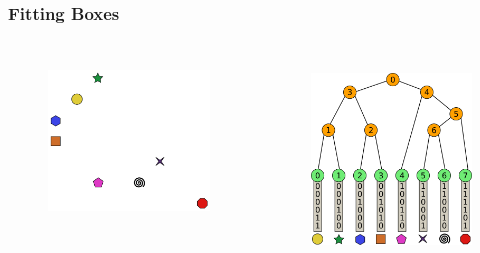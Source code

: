 \documentclass{beamer}
\begin{document}
\begin{frame}
  \frametitle{Fitting Boxes}
  
\begin{columns}[t]

\begin{figure}
\includegraphics[height=45mm]{fit_0.png}
\end{figure}

\begin{figure}
\includegraphics[height=55mm]{radix_tree_bare.png}
\end{figure}
\end{columns}
\end{frame}
\end{document}

